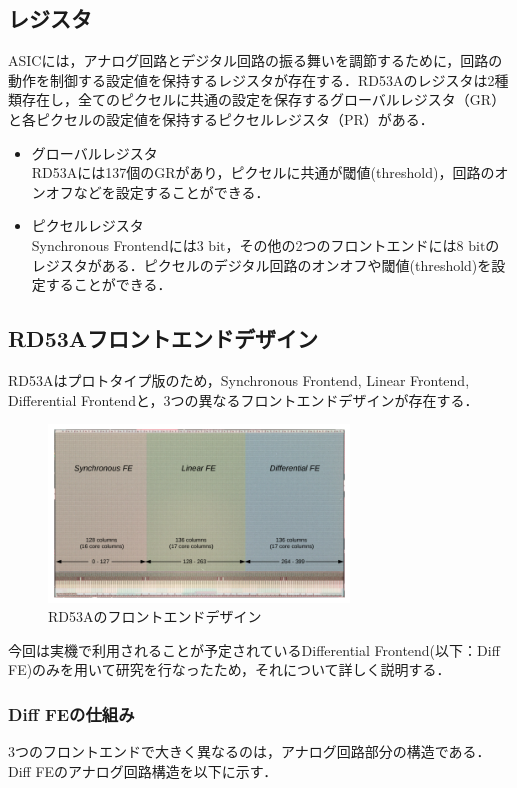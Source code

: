 \subsection{レジスタ}
ASICには，アナログ回路とデジタル回路の振る舞いを調節するために，回路の動作を制御する設定値を保持するレジスタが存在する．RD53Aのレジスタは2種類存在し，全てのピクセルに共通の設定を保存するグローバルレジスタ（GR）と各ピクセルの設定値を保持するピクセルレジスタ（PR）がある．
\begin{itemize}
\item グローバルレジスタ\\
  RD53Aには137個のGRがあり，ピクセルに共通が閾値(threshold)，回路のオンオフなどを設定することができる．
\item ピクセルレジスタ\\
  Synchronous Frontendには3 $\mathrm{bit}$，その他の2つのフロントエンドには8 $\mathrm{bit}$のレジスタがある．ピクセルのデジタル回路のオンオフや閾値(threshold)を設定することができる．
\end{itemize}


\subsection{RD53Aフロントエンドデザイン}
RD53Aはプロトタイプ版のため，Synchronous Frontend, Linear Frontend, Differential Frontendと，3つの異なるフロントエンドデザインが存在する．

\begin{figure}[h]
\centering
\includegraphics[width=8cm]{./figure/RD53A_FE.png}
\caption{RD53Aのフロントエンドデザイン}
\label{fig:RD53AFE}
\end{figure}

今回は実機で利用されることが予定されているDifferential Frontend(以下：Diff FE)のみを用いて研究を行なったため，それについて詳しく説明する．

\subsubsection*{Diff FEの仕組み}
3つのフロントエンドで大きく異なるのは，アナログ回路部分の構造である．Diff FEのアナログ回路構造を以下に示す．\par

